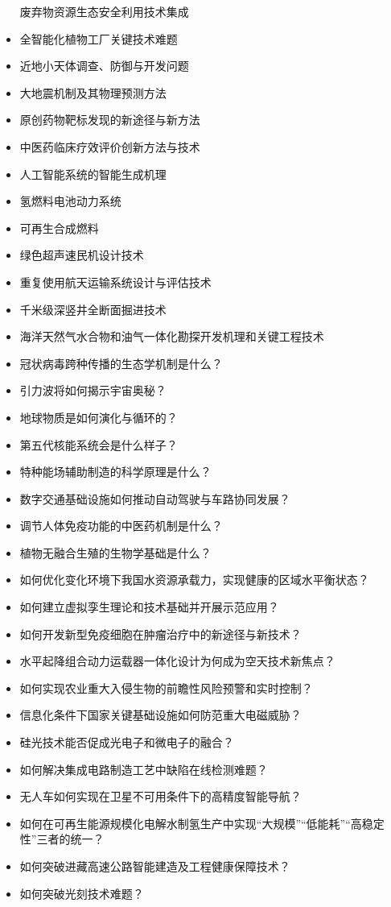 \documentclass[]{tufte-book}
\begin{document}
\begin{itemize}
  废弃物资源生态安全利用技术集成
\item
  全智能化植物工厂关键技术难题
\item
  近地小天体调查、防御与开发问题
\item
  大地震机制及其物理预测方法
\item
  原创药物靶标发现的新途径与新方法
\item
  中医药临床疗效评价创新方法与技术
\item
  人工智能系统的智能生成机理
\item
  氢燃料电池动力系统
\item
  可再生合成燃料
\item
  绿色超声速民机设计技术
\item
  重复使用航天运输系统设计与评估技术
\item
  千米级深竖井全断面掘进技术
\item
  海洋天然气水合物和油气一体化勘探开发机理和关键工程技术
\item
  冠状病毒跨种传播的生态学机制是什么？
\item
  引力波将如何揭示宇宙奥秘？
\item
  地球物质是如何演化与循环的？
\item
  第五代核能系统会是什么样子？
\item
  特种能场辅助制造的科学原理是什么？
\item
  数字交通基础设施如何推动自动驾驶与车路协同发展？
\item
  调节人体免疫功能的中医药机制是什么？
\item
  植物无融合生殖的生物学基础是什么？
\item
  如何优化变化环境下我国水资源承载力，实现健康的区域水平衡状态？
\item
  如何建立虚拟孪生理论和技术基础并开展示范应用？
\item
  如何开发新型免疫细胞在肿瘤治疗中的新途径与新技术？
\item
  水平起降组合动力运载器一体化设计为何成为空天技术新焦点？
\item
  如何实现农业重大入侵生物的前瞻性风险预警和实时控制？
\item
  信息化条件下国家关键基础设施如何防范重大电磁威胁？
\item
  硅光技术能否促成光电子和微电子的融合？
\item
  如何解决集成电路制造工艺中缺陷在线检测难题？
\item
  无人车如何实现在卫星不可用条件下的高精度智能导航？
\item
  如何在可再生能源规模化电解水制氢生产中实现``大规模''``低能耗''``高稳定性''三者的统一？
\item
  如何突破进藏高速公路智能建造及工程健康保障技术？
\item
  如何突破光刻技术难题？
\end{itemize}
\end{document}
